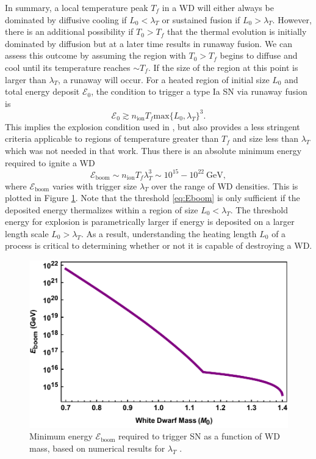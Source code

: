 \documentclass[twocolumn,showpacs,preprintnumbers,amsmath,amssymb,prd]{revtex4}
\newcommand{\Ez}{\mathcal{E}_0}
\newcommand{\Eboom}{\mathcal{E}_\text{boom}}
\newcommand{\GeV}{\text{GeV}}
\begin{document}
In summary, a local temperature peak $T_f$ in a WD will either always be dominated by diffusive cooling if $L_0 < \lambda_T$ or sustained fusion if $L_0 > \lambda_T$.  
However, there is an additional possibility if $T_0 > T_f$ that the thermal evolution is initially dominated by diffusion but at a later time results in runaway fusion. 
We can assess this outcome by assuming the region with $T_0 > T_f$ begins to diffuse and cool until its temperature reaches $\sim T_f$.
If the size of the region at this point is larger than $\lambda_T$, a runaway will occur.  
For a heated region of initial size $L_0$ and total energy deposit $\Ez$, the condition to trigger a type Ia SN via runaway fusion is
\begin{equation}
\label{eq:boom}
  \Ez \gtrsim n_\text{ion} T_f \text{max}\{L_0, \lambda_T\}^3.
\end{equation}
This implies the explosion condition used in \cite{Graham:2015apa}, but also provides a less stringent criteria applicable to regions of temperature greater than $T_f$ and size less than $\lambda_T$ which was not needed in that work.  
Thus there is an absolute minimum energy required to ignite a WD
\begin{equation}
\label{eq:Eboom}
\mathcal{E}_{\text{boom}} \sim n_\text{ion} T_f \lambda_T^3 \sim 10^{15} - 10^{22} ~\GeV,
\end{equation}
where $\mathcal{E}_{\text{boom}} $ varies with trigger size $\lambda_T$ over the range of WD densities.
This is plotted in Figure \ref{fig:Eboom}.
Note that the threshold \eqref{eq:Eboom} is only sufficient if the deposited energy thermalizes within a region of size $L_0 < \lambda_T$.
The threshold energy for explosion is parametrically larger if energy is deposited on a larger length scale $L_0 > \lambda_T$.
As a result, understanding the heating length $L_0$ of a process is critical to determining whether or not it is capable of destroying a WD. 
\begin{figure}
\includegraphics[scale=.45]{Eboom.pdf}
\caption{Minimum energy $\Eboom$ required to trigger SN as a function of WD mass, based on numerical results for $\lambda_T$ \cite{Woosley}.}
\label{fig:Eboom}
\end{figure}
\end{document}

